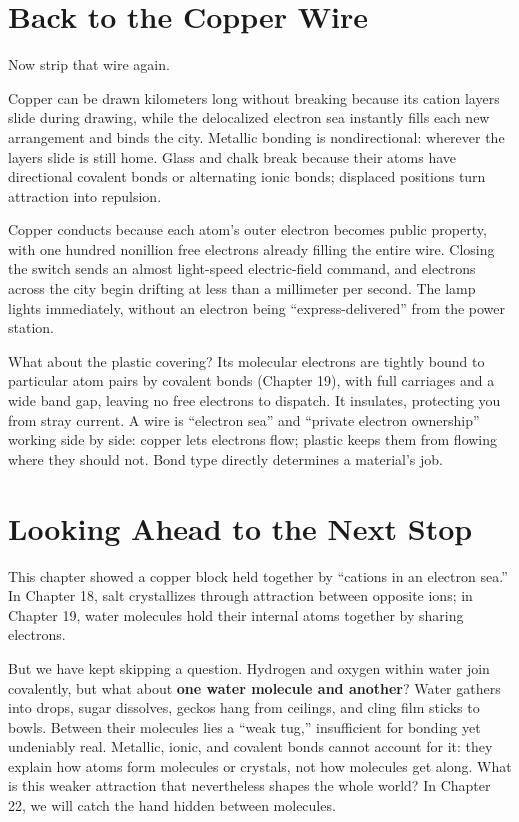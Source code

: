 \section{Back to the Copper Wire}

Now strip that wire again.

Copper can be drawn kilometers long without breaking because its  cation layers slide during drawing, while the delocalized electron sea instantly fills each new arrangement and binds the city. Metallic bonding is nondirectional: wherever the layers slide is still home. Glass and chalk break because their atoms have directional covalent bonds or alternating ionic bonds; displaced positions turn attraction into repulsion.

Copper conducts because each atom's outer electron becomes public property, with one hundred nonillion free electrons already filling the entire wire. Closing the switch sends an almost light-speed electric-field command, and electrons across the city begin drifting at less than a millimeter per second. The lamp lights immediately, without an electron being ``express-delivered'' from the power station.

What about the plastic covering? Its molecular electrons are tightly bound to particular atom pairs by covalent bonds (Chapter 19), with full carriages and a wide band gap, leaving no free electrons to dispatch. It insulates, protecting you from stray current. A wire is ``electron sea'' and ``private electron ownership'' working side by side: copper lets electrons flow; plastic keeps them from flowing where they should not. Bond type directly determines a material's job.

\section{Looking Ahead to the Next Stop}

This chapter showed a copper block held together by ``cations in an electron sea.'' In Chapter 18, salt crystallizes through attraction between opposite ions; in Chapter 19, water molecules hold their internal atoms together by sharing electrons.

But we have kept skipping a question. Hydrogen and oxygen within water join covalently, but what about \textbf{one water molecule and another}? Water gathers into drops, sugar dissolves, geckos hang from ceilings, and cling film sticks to bowls. Between their molecules lies a ``weak tug,'' insufficient for bonding yet undeniably real. Metallic, ionic, and covalent bonds cannot account for it: they explain how atoms form molecules or crystals, not how molecules get along. What is this weaker attraction that nevertheless shapes the whole world? In Chapter 22, we will catch the hand hidden between molecules.

